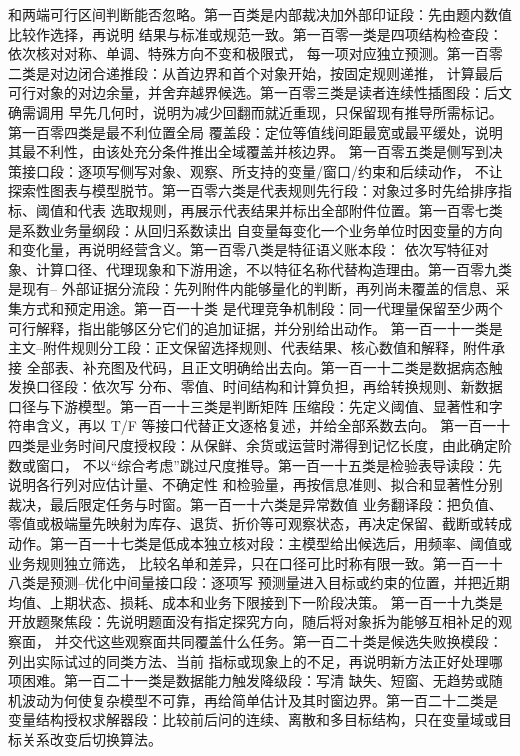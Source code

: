 和两端可行区间判断能否忽略。第一百类是内部裁决加外部印证段：先由题内数值比较作选择，再说明
结果与标准或规范一致。第一百零一类是四项结构检查段：依次核对对称、单调、特殊方向不变和极限式，
每一项对应独立预测。第一百零二类是对边闭合递推段：从首边界和首个对象开始，按固定规则递推，
计算最后可行对象的对边余量，并舍弃越界候选。第一百零三类是读者连续性插图段：后文确需调用
早先几何时，说明为减少回翻而就近重现，只保留现有推导所需标记。第一百零四类是最不利位置全局
覆盖段：定位等值线间距最宽或最平缓处，说明其最不利性，由该处充分条件推出全域覆盖并核边界。
第一百零五类是侧写到决策接口段：逐项写侧写对象、观察、所支持的变量/窗口/约束和后续动作，
不让探索性图表与模型脱节。第一百零六类是代表规则先行段：对象过多时先给排序指标、阈值和代表
选取规则，再展示代表结果并标出全部附件位置。第一百零七类是系数业务量纲段：从回归系数读出
自变量每变化一个业务单位时因变量的方向和变化量，再说明经营含义。第一百零八类是特征语义账本段：
依次写特征对象、计算口径、代理现象和下游用途，不以特征名称代替构造理由。第一百零九类是现有--
外部证据分流段：先列附件内能够量化的判断，再列尚未覆盖的信息、采集方式和预定用途。第一百一十类
是代理竞争机制段：同一代理量保留至少两个可行解释，指出能够区分它们的追加证据，并分别给出动作。
第一百一十一类是主文--附件规则分工段：正文保留选择规则、代表结果、核心数值和解释，附件承接
全部表、补充图及代码，且正文明确给出去向。第一百一十二类是数据病态触发换口径段：依次写
分布、零值、时间结构和计算负担，再给转换规则、新数据口径与下游模型。第一百一十三类是判断矩阵
压缩段：先定义阈值、显著性和字符串含义，再以 T/F 等接口代替正文逐格复述，并给全部系数去向。
第一百一十四类是业务时间尺度授权段：从保鲜、余货或运营时滞得到记忆长度，由此确定阶数或窗口，
不以“综合考虑”跳过尺度推导。第一百一十五类是检验表导读段：先说明各行列对应估计量、不确定性
和检验量，再按信息准则、拟合和显著性分别裁决，最后限定任务与时窗。第一百一十六类是异常数值
业务翻译段：把负值、零值或极端量先映射为库存、退货、折价等可观察状态，再决定保留、截断或转成
动作。第一百一十七类是低成本独立核对段：主模型给出候选后，用频率、阈值或业务规则独立筛选，
比较名单和差异，只在口径可比时称有限一致。第一百一十八类是预测--优化中间量接口段：逐项写
预测量进入目标或约束的位置，并把近期均值、上期状态、损耗、成本和业务下限接到下一阶段决策。
第一百一十九类是开放题聚焦段：先说明题面没有指定探究方向，随后将对象拆为能够互相补足的观察面，
并交代这些观察面共同覆盖什么任务。第一百二十类是候选失败换模段：列出实际试过的同类方法、当前
指标或现象上的不足，再说明新方法正好处理哪项困难。第一百二十一类是数据能力触发降级段：写清
缺失、短窗、无趋势或随机波动为何使复杂模型不可靠，再给简单估计及其时窗边界。第一百二十二类是
变量结构授权求解器段：比较前后问的连续、离散和多目标结构，只在变量域或目标关系改变后切换算法。

